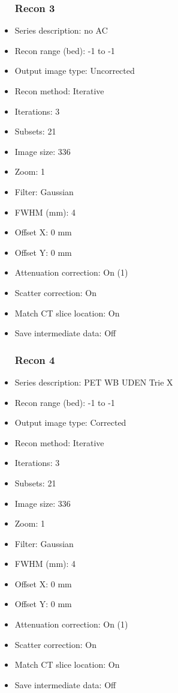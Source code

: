 \documentclass[12pt]{article}
\begin{document}
\begin{itemize}[noitemsep]
\subsubsection{Recon 3}
\item Series description: no AC
\item Recon range (bed): -1 to -1
\item Output image type: Uncorrected
\item Recon method: Iterative
\item Iterations: 3
\item Subsets: 21
\item Image size: 336
\item Zoom: 1
\item Filter: Gaussian
\item FWHM (mm): 4
\item Offset X: 0 mm
\item Offset Y: 0 mm
\item Attenuation correction: On (1)
\item Scatter correction: On
\item Match CT slice location: On
\item Save intermediate data: Off
\subsubsection{Recon 4}
\item Series description: PET WB UDEN Trie X
\item Recon range (bed): -1 to -1
\item Output image type: Corrected
\item Recon method: Iterative
\item Iterations: 3
\item Subsets: 21
\item Image size: 336
\item Zoom: 1
\item Filter: Gaussian
\item FWHM (mm): 4
\item Offset X: 0 mm
\item Offset Y: 0 mm
\item Attenuation correction: On (1)
\item Scatter correction: On
\item Match CT slice location: On
\item Save intermediate data: Off
\end{itemize}
\end{document}
